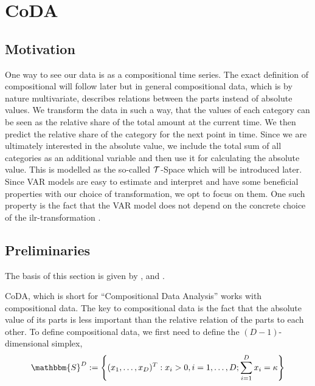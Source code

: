 \section{CoDA}
\label{sec:Coda}

\subsection{Motivation}
\label{sec: Coda Motivation}

One way to see our data is as a compositional time series. The exact definition of compositional will follow later but in general compositional data, which is by nature multivariate, describes relations between the parts instead of absolute values. We transform the data in such a way, that the values of each category can be seen as the relative share of the total amount at the current time. We then predict the relative share of the category for the next point in time. Since we are ultimately interested in the absolute value, we include the total sum of all categories as an additional variable and then use it for calculating the absolute value. This is modelled as the so-called $\mathcal{T}$-Space which will be introduced later. Since VAR models are easy to estimate and interpret and have some beneficial properties with our choice of transformation, we opt to focus on them. One such property is the fact that the VAR model does not depend on the concrete choice of the ilr-transformation \cite{Kynclova:2015}. 


\subsection{Preliminaries}
\label{sec: Coda Preliminaries}
The basis of this section is given by \cite{Kynclova:2015}, \cite{Egozcue:2003} and \cite{Filzmoser:2020}.

CoDA, which is short for "`Compositional Data Analysis"' works with compositional data. The key to compositional data is the fact that the absolute value of its parts is less important than the relative relation of the parts to each other. To define compositional data, we first need to define the $(D-1)$-dimensional simplex,
	\begin{equation*}
	\mathbbm{S}^D := \left\{(x_1,\ldots, x_D)^T: x_i > 0, i =1,\ldots,D; \sum_{i=1}^{D}x_i=\kappa  \right\}
	\label{eq:Simplex Definition}
	\end{equation*}
	
